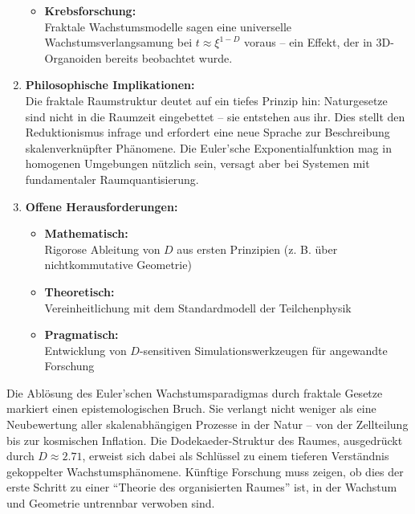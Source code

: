 \begin{enumerate}
\begin{itemize}
        \item \textbf{Krebsforschung:}\\Fraktale Wachstumsmodelle sagen eine universelle Wachstumsverlangsamung bei $t \approx \xi^{1-D}$ voraus – ein Effekt, der in 3D-Organoiden bereits beobachtet wurde.
    \end{itemize}
    \item \textbf{Philosophische Implikationen:}\\Die fraktale Raumstruktur deutet auf ein tiefes Prinzip hin: Naturgesetze sind nicht in die Raumzeit eingebettet – sie entstehen aus ihr. Dies stellt den Reduktionismus infrage und erfordert eine neue Sprache zur Beschreibung skalenverknüpfter Phänomene. Die Euler'sche Exponentialfunktion mag in homogenen Umgebungen nützlich sein, versagt aber bei Systemen mit fundamentaler Raumquantisierung.
    \item \textbf{Offene Herausforderungen:}
    \begin{itemize}
        \item \textbf{Mathematisch:}\\Rigorose Ableitung von $D$ aus ersten Prinzipien (z. B. über nichtkommutative Geometrie)
        \item \textbf{Theoretisch:}\\Vereinheitlichung mit dem Standardmodell der Teilchenphysik
        \item \textbf{Pragmatisch:}\\Entwicklung von $D$-sensitiven Simulationswerkzeugen für angewandte Forschung
    \end{itemize}
\end{enumerate}
Die Ablösung des Euler'schen Wachstumsparadigmas durch fraktale Gesetze markiert einen epistemologischen Bruch. Sie verlangt nicht weniger als eine Neubewertung aller skalenabhängigen
Prozesse in der Natur – von der Zellteilung bis zur kosmischen Inflation. Die Dodekaeder-Struktur des Raumes, ausgedrückt durch $D \approx 2.71$, erweist sich dabei als Schlüssel zu
einem tieferen Verständnis gekoppelter Wachstumsphänomene. Künftige Forschung muss zeigen, ob dies der erste Schritt zu einer \enquote{Theorie des organisierten Raumes} ist, in der
Wachstum und Geometrie untrennbar verwoben sind.
